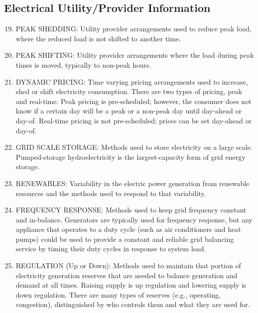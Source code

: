 \subsection*{Electrical Utility/Provider Information}

\begin{enumerate} %
\setcounter{enumi}{18}
\item
PEAK SHEDDING: Utility provider arrangements used to reduce peak load, where the reduced 
load is not shifted to another time.

\item
PEAK SHIFTING: Utility provider arrangements where the load during peak times is moved, 
typically to non-peak hours.

\item
DYNAMIC PRICING: Time varying pricing arrangements used to increase, shed or shift 
electricity consumption. There are two types of pricing, peak and real-time. 
Peak pricing is pre-scheduled; however, the consumer does not know if a certain day will be 
a peak or a non-peak day until day-ahead or day-of. Real-time pricing is not pre-scheduled; 
prices can be set day-ahead or day-of.

\item
GRID SCALE STORAGE: Methods used to store electricity on a large scale. Pumped-storage 
hydroelectricity is the largest-capacity form of grid energy storage.

\item
RENEWABLES: Variability in the electric power generation from renewable resources and 
the methods used to respond to that variability.

\item
FREQUENCY RESPONSE: Methods used to keep grid frequency constant and in-balance. 
Generators are typically used for frequency response, but any appliance that operates to 
a duty cycle (such as air conditioners and heat pumps) could be used to provide a constant 
and reliable grid balancing service by timing their duty cycles in response to system load. 

\item
REGULATION (Up or Down): Methods used to maintain that portion of electricity generation 
reserves that are needed to balance generation and demand at all times. Raising supply is 
up regulation and lowering supply is down regulation. There are many types of 
reserves (e.g., operating, congestion), distinguished by who controls them and what they are used for.


\end{enumerate}
